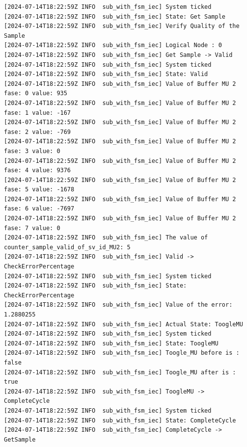\begin{lstlisting}[caption={Second scenario showing the steps through the state machine between the state Get Sample -> Valid, Valid -> Check the Error Percentage -> Toogle MU -> Complete Cycle -> Get Sample.}]
[2024-07-14T18:22:59Z INFO  sub_with_fsm_iec] System ticked
[2024-07-14T18:22:59Z INFO  sub_with_fsm_iec] State: Get Sample
[2024-07-14T18:22:59Z INFO  sub_with_fsm_iec] Verify Quality of the Sample
[2024-07-14T18:22:59Z INFO  sub_with_fsm_iec] Logical Node : 0
[2024-07-14T18:22:59Z INFO  sub_with_fsm_iec] Get Sample -> Valid
[2024-07-14T18:22:59Z INFO  sub_with_fsm_iec] System ticked
[2024-07-14T18:22:59Z INFO  sub_with_fsm_iec] State: Valid
[2024-07-14T18:22:59Z INFO  sub_with_fsm_iec] Value of Buffer MU 2 fase: 0 value: 935
[2024-07-14T18:22:59Z INFO  sub_with_fsm_iec] Value of Buffer MU 2 fase: 1 value: -167
[2024-07-14T18:22:59Z INFO  sub_with_fsm_iec] Value of Buffer MU 2 fase: 2 value: -769
[2024-07-14T18:22:59Z INFO  sub_with_fsm_iec] Value of Buffer MU 2 fase: 3 value: 0
[2024-07-14T18:22:59Z INFO  sub_with_fsm_iec] Value of Buffer MU 2 fase: 4 value: 9376
[2024-07-14T18:22:59Z INFO  sub_with_fsm_iec] Value of Buffer MU 2 fase: 5 value: -1678
[2024-07-14T18:22:59Z INFO  sub_with_fsm_iec] Value of Buffer MU 2 fase: 6 value: -7697
[2024-07-14T18:22:59Z INFO  sub_with_fsm_iec] Value of Buffer MU 2 fase: 7 value: 0
[2024-07-14T18:22:59Z INFO  sub_with_fsm_iec] The value of counter_sample_valid_of_sv_id_MU2: 5
[2024-07-14T18:22:59Z INFO  sub_with_fsm_iec] Valid -> CheckErrorPercentage
[2024-07-14T18:22:59Z INFO  sub_with_fsm_iec] System ticked
[2024-07-14T18:22:59Z INFO  sub_with_fsm_iec] State: CheckErrorPercentage
[2024-07-14T18:22:59Z INFO  sub_with_fsm_iec] Value of the error: 1.2880255
[2024-07-14T18:22:59Z INFO  sub_with_fsm_iec] Actual State: ToogleMU
[2024-07-14T18:22:59Z INFO  sub_with_fsm_iec] System ticked
[2024-07-14T18:22:59Z INFO  sub_with_fsm_iec] State: ToogleMU
[2024-07-14T18:22:59Z INFO  sub_with_fsm_iec] Toogle_MU before is : false
[2024-07-14T18:22:59Z INFO  sub_with_fsm_iec] Toogle_MU after is : true
[2024-07-14T18:22:59Z INFO  sub_with_fsm_iec] ToogleMU -> CompleteCycle
[2024-07-14T18:22:59Z INFO  sub_with_fsm_iec] System ticked
[2024-07-14T18:22:59Z INFO  sub_with_fsm_iec] State: CompleteCycle
[2024-07-14T18:22:59Z INFO  sub_with_fsm_iec] CompleteCycle -> GetSample
\end{lstlisting}
